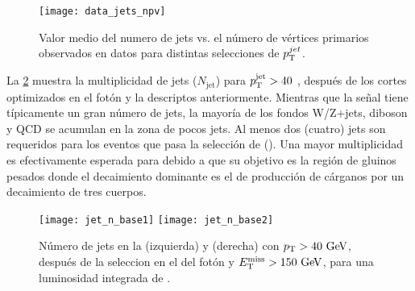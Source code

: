 

\begin{figure}[!htbp]
  \centering
  \texttt{[image: data\_jets\_npv]}
  \caption{Valor medio del numero de jets vs. el número de vértices primarios
    observados en datos para distintas selecciones de $p_{\mathrm{T}}^{jet}$.}
    \label{fig:jets_npv}
\end{figure}




La \cref{fig:opt_jet_n} muestra la multiplicidad de jets ($N_{\mathrm{jet}}$) para
$p_{\mathrm{T}}^{\mathrm{jet}} > 40$ \gev, después de los cortes optimizados en el fotón y la {\met}
descriptos anteriormente.
Mientras que la señal tiene típicamente un gran número
de jets, la mayoría de los fondos W/Z+jets, diboson y QCD se acumulan en la zona
de pocos jets. Al menos dos (cuatro) jets son requeridos para los eventos que
pasa la selección de {\SRL} ({\SRH}).
Una mayor multiplicidad es efectivamente
esperada para {\SRL} debido a que su objetivo es la región de gluinos pesados
donde el decaimiento dominante es el de producción de cárganos por un
decaimiento de tres cuerpos.

\begin{figure}[!htbp]
  \centering
  \texttt{[image: jet\_n\_base1]}
  \texttt{[image: jet\_n\_base2]}
  \caption{Número de jets en la {\SRL} (izquierda) y {\SRH} (derecha) con $\pt > 40 \gev$,
    después de la seleccion en el {\pt} del fotón y $\met > 150\gev$, para una luminosidad integrada de {\ilumi}.}
  \label{fig:opt_jet_n}
\end{figure}


